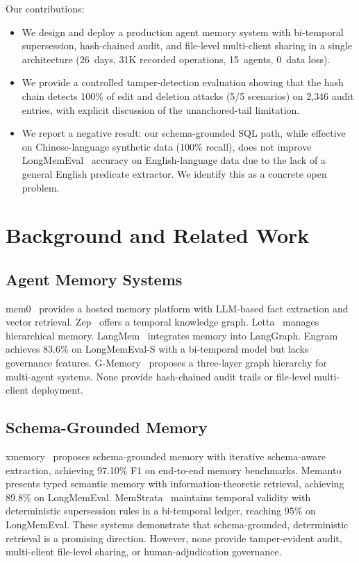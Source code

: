 ﻿\documentclass{article}
\begin{document}
Our contributions:
\begin{itemize}
\item We design and deploy a production agent memory system with bi-temporal supersession, hash-chained audit, and file-level multi-client sharing in a single architecture (26~days, 31K recorded operations, 15~agents, 0~data loss).
\item We provide a controlled tamper-detection evaluation showing that the hash chain detects 100\% of edit and deletion attacks (5/5 scenarios) on 2{,}346 audit entries, with explicit discussion of the unanchored-tail limitation.
\item We report a negative result: our schema-grounded SQL path, while effective on Chinese-language synthetic data (100\% recall), does not improve LongMemEval~\citep{wu2024longmemeval} accuracy on English-language data due to the lack of a general English predicate extractor. We identify this as a concrete open problem.
\end{itemize}

\section{Background and Related Work}
\label{sec:related}

\subsection{Agent Memory Systems}
mem0~\citep{mem0} provides a hosted memory platform with LLM-based fact extraction and vector retrieval. Zep~\citep{zep} offers a temporal knowledge graph. Letta~\citep{letta} manages hierarchical memory. LangMem~\citep{langmem} integrates memory into LangGraph. Engram~\citep{engram} achieves 83.6\% on LongMemEval-S with a bi-temporal model but lacks governance features. G-Memory~\citep{gmotion} proposes a three-layer graph hierarchy for multi-agent systems. None provide hash-chained audit trails or file-level multi-client deployment.

\subsection{Schema-Grounded Memory}
xmemory~\citep{xmemory} proposes schema-grounded memory with iterative schema-aware extraction, achieving 97.10\% F1 on end-to-end memory benchmarks. Memanto~\citep{memanto} presents typed semantic memory with information-theoretic retrieval, achieving 89.8\% on LongMemEval. MemStrata~\citep{memstrata} maintains temporal validity with deterministic supersession rules in a bi-temporal ledger, reaching 95\% on LongMemEval. These systems demonstrate that schema-grounded, deterministic retrieval is a promising direction. However, none provide tamper-evident audit, multi-client file-level sharing, or human-adjudication governance.
\end{document}
